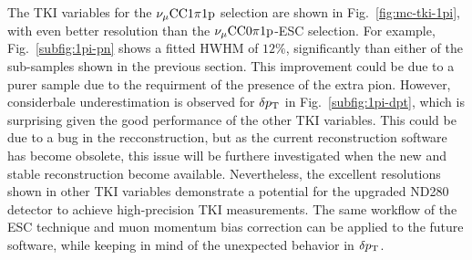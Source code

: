      The TKI variables for the $\nu_{\mu}\textrm{CC}1\pi1\textrm{p}$ selection are shown in Fig.~\ref{fig:mc-tki-1pi}, with even better resolution than the $\nu_{\mu}\textrm{CC}0\pi1\textrm{p}$-ESC selection.
     For example, Fig.~\ref{subfig:1pi-pn} shows a fitted HWHM of $12\%$, significantly than either of the sub-samples shown in the previous section.
     This improvement could be due to a purer sample due to the requirment of the presence of the extra pion.
     However, considerbale underestimation is observed for $\delta p_\textrm{T}$ in Fig.~\ref{subfig:1pi-dpt}, which is surprising given the good performance of the other TKI variables.
     This could be due to a bug in the recconstruction, but as the current reconstruction software has become obsolete, this issue will be furthere investigated when the new and stable reconstruction become available.
     Nevertheless, the excellent resolutions shown in other TKI variables demonstrate a potential for the upgraded ND280 detector to achieve high-precision TKI measurements.
     The same workflow of the ESC technique and muon momentum bias correction can be applied to the future software, while keeping in mind of the unexpected behavior in $\delta p_\textrm{T}$.
